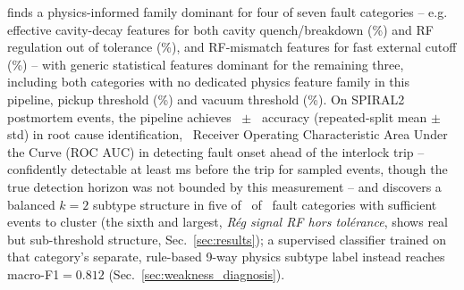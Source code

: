  finds a physics-informed family dominant for four of seven fault categories -- e.g. effective cavity-decay features for both cavity quench/breakdown (\MetricOneZeroPhysicsGroupShapCavityQuenchBreakdownTopGroupMeanPct\%) and RF regulation out of tolerance (\MetricOneZeroPhysicsGroupShapRfRegulationOutOfToleranceTopGroupMeanPct\%), and RF-mismatch features for fast external cutoff (\MetricOneZeroPhysicsGroupShapFastExternalCutoffTopGroupMeanPct\%) -- with generic statistical features dominant for the remaining three, including both categories with no dedicated physics feature family in this pipeline, pickup threshold (\MetricOneZeroPhysicsGroupShapPickupThresholdTopGroupMeanPct\%) and vacuum threshold (\MetricOneZeroPhysicsGroupShapVacuumThresholdTopGroupMeanPct\%). On \MetricZeroSixBinaryClassificationNEventsTotal{} SPIRAL2 postmortem events, the pipeline achieves \MetricZeroEightPhaseThreeaRootcauseStabilityAccuracyMean\ $\pm$ \MetricZeroEightPhaseThreeaRootcauseStabilityAccuracyStd\ accuracy (repeated-split mean $\pm$ std) in root cause identification, \MetricZeroFivePhaseZeroPrecursorRandomForestRocAuc\ Receiver Operating Characteristic Area Under the Curve (ROC AUC) in detecting fault onset ahead of the interlock trip -- confidently detectable at least \MetricZeroFivePrecursorLeadTimeLeadTimeMsLowerBoundMeanCensored{}ms before the trip for sampled events, though the true detection horizon was not bounded by this measurement -- and discovers a balanced $k=2$ subtype structure in five of \MetricZeroNinecEnhancedSubclassDiscoveryNCategoriesAnalyzed\ of \MetricZeroNinecEnhancedSubclassDiscoveryNCategoriesTotal\ fault categories with sufficient events to cluster (the sixth and largest, \textit{Rég signal RF hors tolérance}, shows real but sub-threshold structure, Sec.~\ref{sec:results}); a supervised classifier trained on that category's separate, rule-based 9-way physics subtype label instead reaches macro-F1$=0.812$ (Sec.~\ref{sec:weakness_diagnosis}). %
